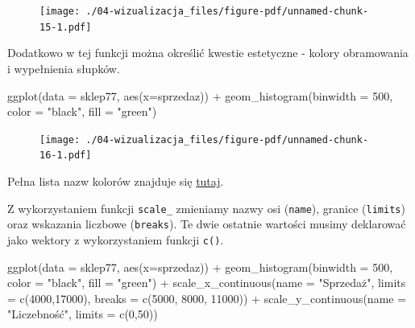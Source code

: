 \documentclass[
  letterpaper,
  DIV=11,
  numbers=noendperiod]{scrreprt}
\newenvironment{Shaded}{\begin{snugshade}}{\end{snugshade}}
\newcommand{\AttributeTok}[1]{\textcolor[rgb]{0.40,0.45,0.13}{#1}}
\newcommand{\DecValTok}[1]{\textcolor[rgb]{0.68,0.00,0.00}{#1}}
\newcommand{\FunctionTok}[1]{\textcolor[rgb]{0.28,0.35,0.67}{#1}}
\newcommand{\NormalTok}[1]{\textcolor[rgb]{0.00,0.23,0.31}{#1}}
\newcommand{\SpecialCharTok}[1]{\textcolor[rgb]{0.37,0.37,0.37}{#1}}
\newcommand{\StringTok}[1]{\textcolor[rgb]{0.13,0.47,0.30}{#1}}
\begin{document}
\begin{figure}[H]

{\centering \texttt{[image: ./04-wizualizacja\_files/figure-pdf/unnamed-chunk-15-1.pdf]}

}

\end{figure}

Dodatkowo w tej funkcji można określić kwestie estetyczne - kolory
obramowania i wypełnienia słupków.

\begin{Shaded}
\begin{Highlighting}[]
\FunctionTok{ggplot}\NormalTok{(}\AttributeTok{data =}\NormalTok{ sklep77, }\FunctionTok{aes}\NormalTok{(}\AttributeTok{x=}\NormalTok{sprzedaz)) }\SpecialCharTok{+}
  \FunctionTok{geom\_histogram}\NormalTok{(}\AttributeTok{binwidth =} \DecValTok{500}\NormalTok{, }\AttributeTok{color =} \StringTok{"black"}\NormalTok{, }\AttributeTok{fill =} \StringTok{"green"}\NormalTok{)}
\end{Highlighting}
\end{Shaded}

\begin{figure}[H]

{\centering \texttt{[image: ./04-wizualizacja\_files/figure-pdf/unnamed-chunk-16-1.pdf]}

}

\end{figure}

Pełna lista nazw kolorów znajduje się
\href{http://www.stat.columbia.edu/~tzheng/files/Rcolor.pdf}{tutaj}.

Z wykorzystaniem funkcji \texttt{scale\_} zmieniamy nazwy osi
(\texttt{name}), granice (\texttt{limits}) oraz wskazania liczbowe
(\texttt{breaks}). Te dwie ostatnie wartości musimy deklarować jako
wektory z wykorzystaniem funkcji \texttt{c()}.

\begin{Shaded}
\begin{Highlighting}[]
\FunctionTok{ggplot}\NormalTok{(}\AttributeTok{data =}\NormalTok{ sklep77, }\FunctionTok{aes}\NormalTok{(}\AttributeTok{x=}\NormalTok{sprzedaz)) }\SpecialCharTok{+}
  \FunctionTok{geom\_histogram}\NormalTok{(}\AttributeTok{binwidth =} \DecValTok{500}\NormalTok{, }
                 \AttributeTok{color =} \StringTok{"black"}\NormalTok{, }\AttributeTok{fill =} \StringTok{"green"}\NormalTok{) }\SpecialCharTok{+}
  \FunctionTok{scale\_x\_continuous}\NormalTok{(}\AttributeTok{name =} \StringTok{"Sprzedaż"}\NormalTok{, }
                     \AttributeTok{limits =} \FunctionTok{c}\NormalTok{(}\DecValTok{4000}\NormalTok{,}\DecValTok{17000}\NormalTok{),}
                     \AttributeTok{breaks =} \FunctionTok{c}\NormalTok{(}\DecValTok{5000}\NormalTok{, }\DecValTok{8000}\NormalTok{, }\DecValTok{11000}\NormalTok{)) }\SpecialCharTok{+}
  \FunctionTok{scale\_y\_continuous}\NormalTok{(}\AttributeTok{name =} \StringTok{"Liczebność"}\NormalTok{,}
                     \AttributeTok{limits =} \FunctionTok{c}\NormalTok{(}\DecValTok{0}\NormalTok{,}\DecValTok{50}\NormalTok{))}
\end{Highlighting}
\end{Shaded}
\end{document}

